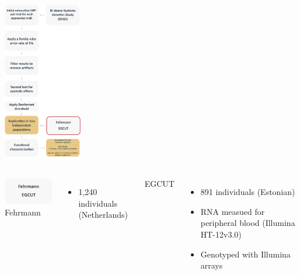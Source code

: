 \documentclass{beamer}
\begin{document}
\begin{frame}
\begin{center}
\includegraphics[height=7cm]{images/methods8.png} \\
\end{center}
\end{frame}

\begin{frame}
\begin{columns}[c]
\includegraphics[width=4.5cm]{images/rep1.png} \\
Fehrmann
\begin{itemize}
\item 1,240 individuals (Netherlands) 
\end{itemize}
\vspace{0.3cm}
EGCUT
\begin{itemize}
\item 891 individuals (Estonian)
\vspace{0.3cm}
\item RNA measued for peripheral blood (Illumina HT-12v3.0)
\vspace{0.1cm} 
\item Genotyped with Illumina arrays
\end{itemize}
\end{columns}
\end{frame}
\end{document}
